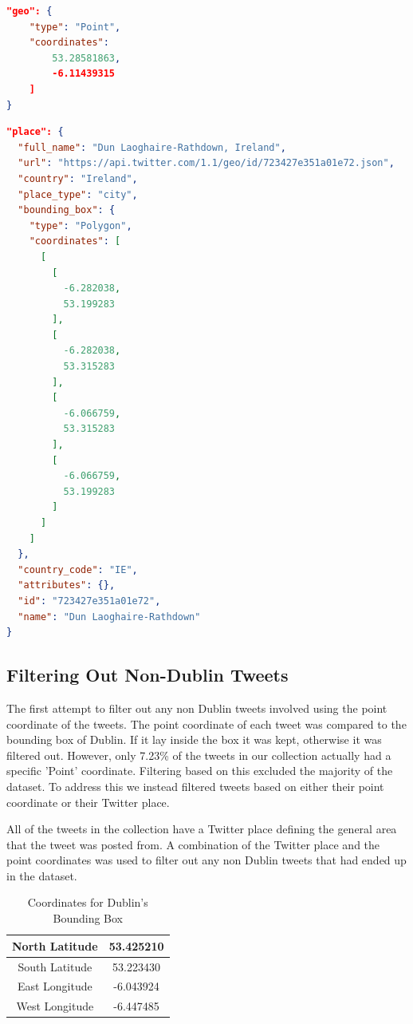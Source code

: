 \begin{lstlisting}[caption={Geo-tagged Tweet with Point Coordinate},
captionpos=b,label=lst:pointjson,language=json,firstnumber=1]
"geo": {
    "type": "Point",
    "coordinates": 
        53.28581863,
        -6.11439315
    ]
}
\end{lstlisting}

\begin{lstlisting}[caption={Geo-tagged Tweet with Twitter Place},captionpos=b,label=lst:placejson,language=json,firstnumber=1]
"place": {
  "full_name": "Dun Laoghaire-Rathdown, Ireland",
  "url": "https://api.twitter.com/1.1/geo/id/723427e351a01e72.json",
  "country": "Ireland",
  "place_type": "city",
  "bounding_box": {
    "type": "Polygon",
    "coordinates": [
      [
        [
          -6.282038,
          53.199283
        ],
        [
          -6.282038,
          53.315283
        ],
        [
          -6.066759,
          53.315283
        ],
        [
          -6.066759,
          53.199283
        ]
      ]
    ]
  },
  "country_code": "IE",
  "attributes": {},
  "id": "723427e351a01e72",
  "name": "Dun Laoghaire-Rathdown"
}
\end{lstlisting}

\subsection*{Filtering Out Non-Dublin Tweets}

The first attempt to filter out any non Dublin tweets involved using the point coordinate of the tweets. The point coordinate of each tweet was compared to the bounding box of Dublin. If it lay inside the box it was kept, otherwise it was filtered out. However, only 7.23\% of the tweets in our collection actually had a specific 'Point' coordinate. Filtering based on this excluded the majority of the dataset. To address this we instead filtered tweets based on either their point coordinate or their Twitter place.

All of the tweets in the collection have a Twitter place defining the general area that the tweet was posted from. A combination of the Twitter place and the point coordinates was used to filter out any non Dublin tweets that had ended up in the dataset. 

\begin{table}[h!]
\caption{Coordinates for Dublin's Bounding Box}
\label{tab:dublinbb}
\setlength\extrarowheight{5pt}
\begin{tabular}{|c|c|}
\hline
North Latitude  & 53.425210 \\ \hline
South Latitude  & 53.223430 \\ \hline
East Longitude & -6.043924 \\ \hline
West Longitude & -6.447485 \\ \hline
\end{tabular}
\end{table}

